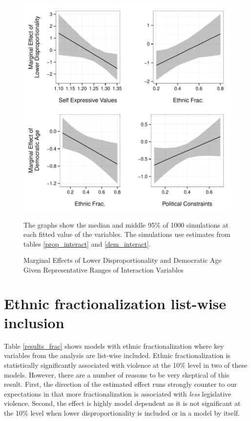 \documentclass[a4paper]{article}\usepackage[]{graphicx}\usepackage[]{color}
\newenvironment{knitrout}{}{} %
\begin{document}
\begin{figure}
    \begin{center}
\begin{knitrout}
\color{fgcolor}
\includegraphics[width=0.95\linewidth]{figure/marginalEffects-1} 

\end{knitrout}
    \end{center}
    \caption{Marginal Effects of Lower Disproportionality and Democratic Age Given Representative Ranges of Interaction Variables}
    \label{marginal_effect_plot}
    \begin{singlespace}
      {\scriptsize{The graphs show the median and middle 95\% of 1000 simulations at each fitted value of the variables. The simulations use estimates from tables \ref{prop_interact} and \ref{dem_interact}.}}
    \end{singlespace}
\end{figure}


\section*{Ethnic fractionalization list-wise inclusion}


Table \ref{results_frac} shows models with ethnic fractionalization where key variables from the analysis are list-wise included. Ethnic fractionalization is statistically significantly associated with violence at the 10\% level in two of these models. However, there are a number of reasons to be very skeptical of this result. First, the direction of the estimated effect runs strongly counter to our expectations in that more fractionalization is associated with \emph{less} legislative violence. Second, the effect is highly model dependent as it is not significant at the 10\% level when lower disproportionality is included or in a model by itself.
\end{document}
